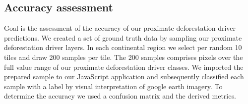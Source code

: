 		\subsection{Accuracy assessment}
		\label{subsec:results_accuracy_assessment}
			 Goal is the assessment of the accuracy of our proximate deforestation driver predictions. We created a set of ground truth data by sampling our proximate deforestation driver layers. In each continental region we select per random 10 tiles and draw 200 samples per tile. The 200 samples comprises pixels over the full value range of our proximate deforestation driver classes. We imported the prepared sample to our JavaScript application and subsequently classified each sample with a label by visual interpretation of google earth imagery. To determine the accuracy we used a confusion matrix and the derived metrics.

